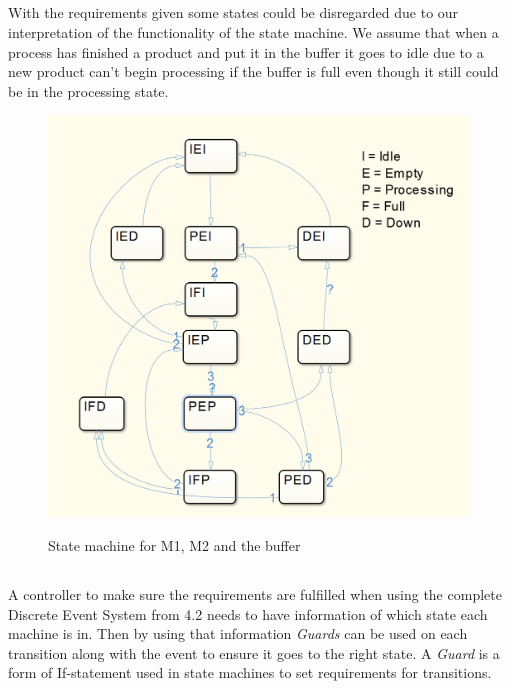 \documentclass[12pt,a4paper]{article}
\begin{document}
\subsection{}
With the requirements given some states could be disregarded due to our
interpretation of the functionality of the state machine. We assume that
when a process has finished a product and put it in the buffer it goes
to idle due to a new product can't begin processing if the buffer is
full even though it still could be in the processing state.
\begin{center}
	\begin{figure}[H]
      \centering
	\includegraphics[scale=0.5]{des3.png}
	\label{fig:des1}
	\caption{State machine for M1, M2 and the buffer}
	\end{figure}
\end{center}

\subsection{}
A controller to make sure the requirements are fulfilled when using the
complete Discrete Event System from 4.2 needs to have information of
which state each machine is in. Then by using that information
\emph{Guards} can be used on each transition along with the event to
ensure it goes to the right state. A \emph{Guard} is a form of
If-statement used in state machines to set requirements for transitions.
\end{document}
